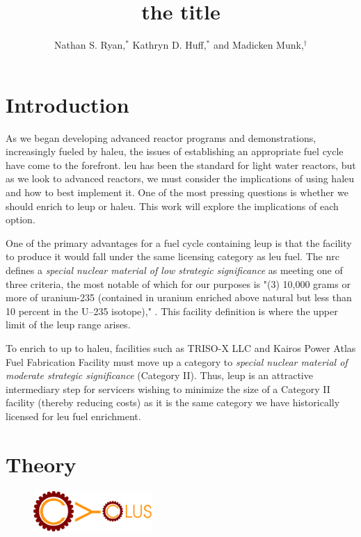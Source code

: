 \documentclass{anstrans}
\title{the title}
\author{Nathan S. Ryan,$^{*}$ Kathryn D. Huff,$^{*}$ and Madicken Munk,$^{\dagger}$}
\institute{
$^{*}$Advanced Reactors and Fuel Cycles Group, University of Illinois,
Urbana, IL, nsryan2@illinois.edu
\and
$^{\dagger}$Scientific Computing, Reactor Analysis and Modeling Group, Oregon State University, Corvallis, OR
}
\begin{document}
\section{Introduction}

As we began developing advanced reactor programs and demonstrations, increasingly fueled by \gls{haleu}, the issues of establishing an appropriate fuel cycle have come to the forefront. \gls{leu} has been the standard for light water reactors, but as we look to advanced reactors, we must consider the implications of using \gls{haleu} and how to best implement it. One of the most pressing questions is whether we should enrich to \gls{leup} or \gls{haleu}. This work will explore the implications of each option.

One of the primary advantages for a fuel cycle containing \gls{leup} is that the facility to produce it would fall under the same licensing category as \gls{leu} fuel. The \gls{nrc} defines a \textit{special nuclear material of low strategic significance} as meeting one of three criteria, the most notable of which for our purposes is "(3) 10,000 grams or more of uranium-235 (contained in uranium enriched above natural but less than 10 percent in the U–235 isotope)," \cite{nrc_catiii}. This facility definition is where the upper limit of the \gls{leup} range arises.

To enrich to up to \gls{haleu}, facilities such as TRISO-X LLC and Kairos Power Atlas Fuel Fabrication Facility must move up a category to \textit{special nuclear material of moderate strategic significance} (Category II). Thus, \gls{leup} is an attractive intermediary step for servicers wishing to minimize the size of a Category II facility (thereby reducing costs) as it is the same category we have historically licensed for \gls{leu} fuel enrichment.

\section{Theory}

\begin{figure}[!htbp]
  \centering
  \includegraphics[width=0.4\textwidth]{../images/cyclus_logo.png}
  \label{fig:cyclus_logo}
\end{figure}
\end{document}
